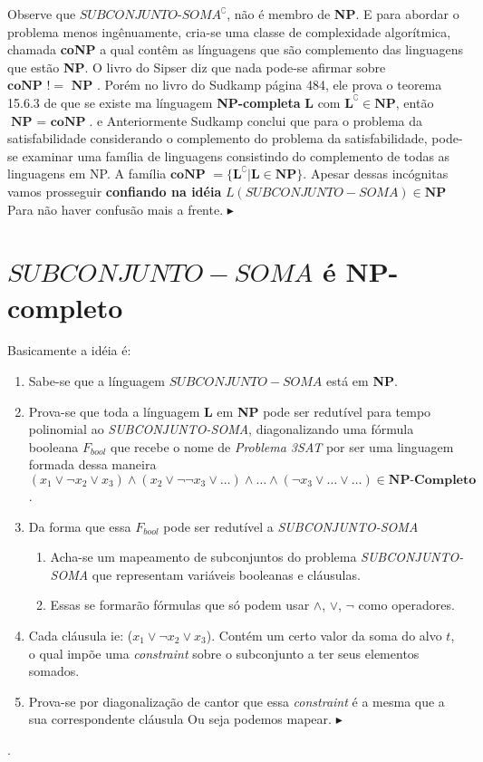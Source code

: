 \documentclass[12pt, a4paper]{article}
\begin{document}
Observe que $\textit{SUBCONJUNTO-SOMA}^\complement$, não é membro de \textbf{NP}. E para abordar o problema menos ingênuamente, cria-se uma classe de complexidade algorítmica, chamada \textbf{coNP} a qual contêm as línguagens que são complemento das linguagens que estão \textbf{NP}. O livro do Sipser diz que nada pode-se afirmar sobre $\textbf{coNP } != \textbf{ NP}$ \cite{sipser06}. Porém no livro do Sudkamp página 484, ele prova o teorema 15.6.3 de que se existe ma línguagem \textbf{NP-completa} \textbf{L} com $\textbf{L}^\complement \in \textbf{NP}$, então $\textbf{NP } = \textbf{ coNP}$. e Anteriormente Sudkamp conclui que para o problema da satisfabilidade considerando o complemento do problema da satisfabilidade, pode-se examinar uma família de linguagens consistindo do complemento de todas as linguagens em NP. A família $\textbf{coNP } = {\lbrace \textbf{L}^\complement | \textbf{L} \in \textbf{NP} \rbrace}$. Apesar dessas incógnitas vamos prosseguir \textbf{confiando na idéia} $L(SUBCONJUNTO-SOMA) \in \textbf{NP}$ Para não haver confusão mais a frente. $\blacktriangleright$

\section{$SUBCONJUNTO-SOMA$ é \textbf{NP-completo}}

Basicamente a idéia é:

\begin{enumerate}
  \item Sabe-se que a línguagem $SUBCONJUNTO-SOMA$ está em \textbf{NP}.
  \item Prova-se que toda a línguagem \textbf{L} em \textbf{NP} pode ser redutível para tempo polinomial ao \textit{SUBCONJUNTO-SOMA}, diagonalizando uma fórmula booleana $F_{bool}$ que recebe o nome de \textit{Problema 3SAT} por ser uma linguagem formada dessa maneira $(x_1 \vee \neg x_2 \vee x_3) \wedge (x_2 \vee \neg \neg x_3 \vee \ldots) \wedge \ldots \wedge (\neg x_3 \vee \ldots \vee \ldots) \in \textbf{NP-Completo}$.
  \item Da forma que essa $F_{bool}$ pode ser redutível a \textit{SUBCONJUNTO-SOMA}
  \begin{enumerate}
    \item Acha-se um mapeamento de subconjuntos do problema \textit{SUBCONJUNTO-SOMA} que representam variáveis booleanas e cláusulas.
    \item Essas se formarão fórmulas que só podem usar $\wedge$, $\vee$, $\neg$ como operadores.
  \end{enumerate}
  \item Cada cláusula ie: ($x_1 \vee \neg x_2 \vee x_3$). Contém um certo valor da soma do alvo $t$, o qual impõe uma \textit{constraint} sobre o subconjunto a ter seus elementos somados.
  \item Prova-se por diagonalização de cantor que essa \textit{constraint} é a mesma que a sua correspondente cláusula  Ou seja podemos mapear. $\blacktriangleright$
\end{enumerate}.
\end{document}
